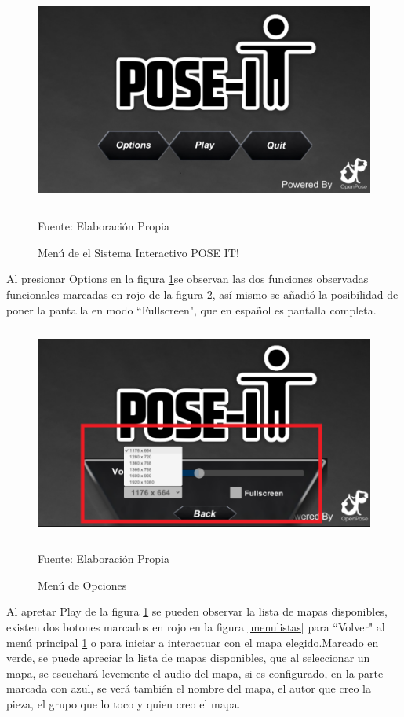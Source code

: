 \begin{figure}[h!]
	\centering
	\includegraphics[width=12cm,height=7cm]{./Images/menu.png}
	\caption{Menú de el Sistema Interactivo POSE IT!}
	\footnotesize Fuente: Elaboración Propia
	\label{menu}
\end{figure}

Al presionar Options en la figura \ref{menu}se observan las dos funciones observadas funcionales marcadas en rojo de la figura \ref{menuoptions}, así mismo se añadió la posibilidad de poner la pantalla en modo ``Fullscreen", que en español es pantalla completa.

\begin{figure}[t!]
	\centering
	\includegraphics[width=12cm,height=7cm]{./Images/menuopciones.png}
	\caption{Menú de Opciones}
	\footnotesize Fuente: Elaboración Propia
	\label{menuoptions}
\end{figure}

Al apretar Play de la figura \ref{menu} se pueden observar la lista de mapas disponibles, existen dos botones marcados en rojo en la figura \ref{menulistas} para ``Volver" al menú principal \ref{menu} o para iniciar a interactuar con el mapa elegido.Marcado en verde, se puede apreciar la lista de mapas disponibles, que al seleccionar un mapa, se escuchará levemente el audio del mapa, si es configurado, en la parte marcada con azul, se verá también el nombre del mapa, el autor que creo la pieza, el grupo que lo toco y quien creo el mapa.

